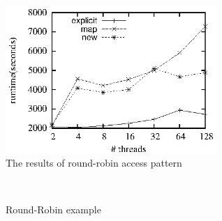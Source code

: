 \documentclass[preprint]{sigplanconf}
\begin{document}
\begin{figure}[ht!]
  \centering
  \includegraphics[width=80mm]{fig/rr.eps}
  \caption{The results of round-robin access pattern}
  \label{fig:rr_eval}
\end{figure}
\begin{figure}
  \centering
  \\
  \caption{Round-Robin example}
  \label{fig:rbb_exp}
\end{figure}

%
%
\end{document}
